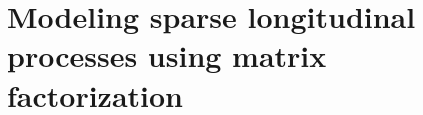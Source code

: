 \documentclass[preprint]{imsart}
\numberwithin{equation}{section}
\theoremstyle{plain}
\DeclareMathOperator*{\rank}{rank}
\begin{document}












\section{Modeling sparse longitudinal processes using matrix factorization}\label{s:context}
\end{document}

